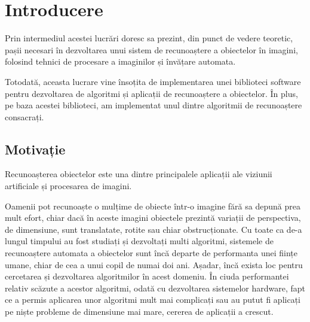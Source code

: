 \chapter{Introducere}


Prin intermediul acestei lucrări doresc sa prezint, din punct de vedere teoretic, pașii necesari în dezvoltarea unui sistem de recunoaștere a obiectelor în imagini, folosind tehnici de procesare a imaginilor și învățare automata.

Totodată, aceasta lucrare vine însoțita de implementarea unei biblioteci software pentru dezvoltarea de algoritmi și aplicații de recunoaștere a obiectelor.
În plus, pe baza acestei biblioteci, am implementat unul dintre algoritmii de recunoaștere consacrați.



\section{Motivație}

Recunoașterea obiectelor este una dintre principalele aplicații ale viziunii artificiale și procesarea de imagini. 

Oamenii pot recunoaște o mulțime de obiecte într-o imagine fără sa depună prea mult efort, chiar dacă în aceste imagini obiectele prezintă variații de perspectiva, de dimensiune, sunt translatate, rotite sau chiar obstrucționate. 
Cu toate ca de-a lungul timpului au fost studiați și dezvoltați multi algoritmi, sistemele de recunoaștere automata a obiectelor sunt încă departe de performanta unei ființe umane, chiar de cea a unui copil de numai doi ani.
Așadar, încă exista loc pentru cercetarea și dezvoltarea algoritmilor în acest domeniu.
În ciuda performantei relativ scăzute a acestor algoritmi, odată cu dezvoltarea sistemelor hardware, fapt ce a permis aplicarea unor algoritmi mult mai complicați sau au putut fi aplicați pe niște probleme de dimensiune mai mare, cererea de aplicații a crescut. 

